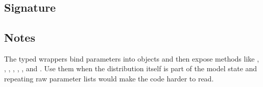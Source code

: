 \documentclass[letterpaper,10pt,english]{sphinxmanual}
\begin{document}
\section{}
\label{\detokenize{api_reference:object-wrappers}}

\subsection{Signature}
\label{\detokenize{api_reference:id19}}
\begin{sphinxVerbatim}[commandchars=\\\{\}]
\end{sphinxVerbatim}


\subsection{Notes}
\label{\detokenize{api_reference:id20}}
\sphinxAtStartPar
The typed wrappers bind parameters into objects and then expose methods like , , , , , , and . Use them when the distribution itself is part of the model state and repeating raw parameter lists would make the code harder to read.
\end{document}
